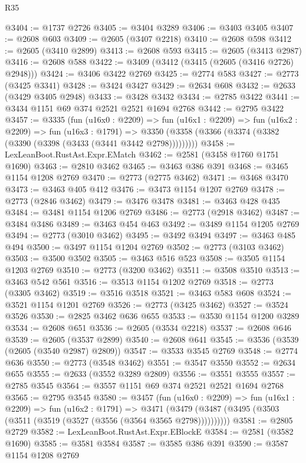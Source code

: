 \begin{lexlean}{R35}
\begin{coremodule}
@3404 := @1737 @2726
@3405 := @3404 @3289
@3406 := @3403 @3405
@3407 := @2608 @603
@3409 := @2605 (@3407 @2218)
@3410 := @2608 @598
@3412 := @2605 (@3410 @2899)
@3413 := @2608 @593
@3415 := @2605 (@3413 @2987)
@3416 := @2608 @588
@3422 := @3409 (@3412 (@3415 (@2605 (@3416 @2726) @2948)))
@3424 := @3406 @3422 @2769
@3425 := @2774 @583
@3427 := @2773 (@3425 @3341)
@3428 := @3424 @3427
@3429 := @2634 @608
@3432 := @2633 (@3429 @3405 @2948)
@3433 := @3428 @3432
@3434 := @2785 @3422
@3441 := @3434 @1151 @69 @374 @2521 @2521 @1694 @2768
@3442 := @2795 @3422
@3457 := @3335
    (fun (u16x0 : @2209) =>
    fun (u16x1 : @2209) =>
    fun (u16x2 : @2209) =>
    fun (u16x3 : @1791) =>
    @3350 (@3358 (@3366 (@3374 (@3382 (@3390 (@3398 (@3433 (@3441 @3442 @2798)))))))))
@3458 := LexLeanBoot.RustAst.Expr.EMatch
@3462 := @2581 (@3458 @1760 @1751 @1690)
@3463 := @2810 @3462
@3465 := @3463 @386 @391
@3468 := @3465 @1154 @1208 @2769
@3470 := @2773 (@2775 @3462)
@3471 := @3468 @3470
@3473 := @3463 @405 @412
@3476 := @3473 @1154 @1207 @2769
@3478 := @2773 (@2846 @3462)
@3479 := @3476 @3478
@3481 := @3463 @428 @435
@3484 := @3481 @1154 @1206 @2769
@3486 := @2773 (@2918 @3462)
@3487 := @3484 @3486
@3489 := @3463 @454 @463
@3492 := @3489 @1154 @1205 @2769
@3494 := @2773 (@3010 @3462)
@3495 := @3492 @3494
@3497 := @3463 @485 @494
@3500 := @3497 @1154 @1204 @2769
@3502 := @2773 (@3103 @3462)
@3503 := @3500 @3502
@3505 := @3463 @516 @523
@3508 := @3505 @1154 @1203 @2769
@3510 := @2773 (@3200 @3462)
@3511 := @3508 @3510
@3513 := @3463 @542 @561
@3516 := @3513 @1154 @1202 @2769
@3518 := @2773 (@3305 @3462)
@3519 := @3516 @3518
@3521 := @3463 @583 @608
@3524 := @3521 @1154 @1201 @2769
@3526 := @2773 (@3425 @3462)
@3527 := @3524 @3526
@3530 := @2825 @3462 @636 @655
@3533 := @3530 @1154 @1200 @3289
@3534 := @2608 @651
@3536 := @2605 (@3534 @2218)
@3537 := @2608 @646
@3539 := @2605 (@3537 @2899)
@3540 := @2608 @641
@3545 := @3536 (@3539 (@2605 (@3540 @2987) @2809))
@3547 := @3533 @3545 @2769
@3548 := @2774 @636
@3550 := @2773 (@3548 @3462)
@3551 := @3547 @3550
@3552 := @2634 @655
@3555 := @2633 (@3552 @3289 @2809)
@3556 := @3551 @3555
@3557 := @2785 @3545
@3564 := @3557 @1151 @69 @374 @2521 @2521 @1694 @2768
@3565 := @2795 @3545
@3580 := @3457
    (fun (u16x0 : @2209) =>
    fun (u16x1 : @2209) =>
    fun (u16x2 : @1791) =>
    @3471 (@3479 (@3487 (@3495 (@3503 (@3511 (@3519 (@3527 (@3556 (@3564 @3565 @2798))))))))))
@3581 := @2805 @2729
@3582 := LexLeanBoot.RustAst.Expr.EBlockE
@3584 := @2581 (@3582 @1690)
@3585 := @3581 @3584
@3587 := @3585 @386 @391
@3590 := @3587 @1154 @1208 @2769

\end{coremodule}
\end{lexlean}
